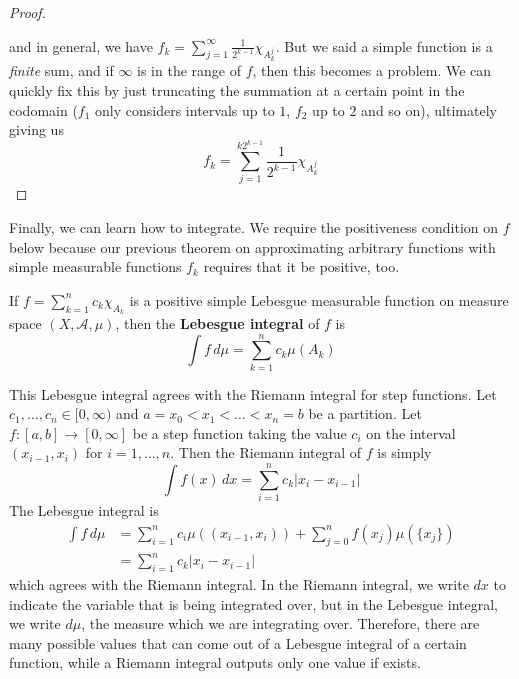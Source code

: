 \begin{proof}
\begin{center}
    \end{center}
    and in general, we have $f_k = \sum_{j=1}^\infty \frac{1}{2^{k-1}} \chi_{A^j_k}$. But we said a simple function is a \textit{finite} sum, and if $\infty$ is in the range of $f$, then this becomes a problem. We can quickly fix this by just truncating the summation at a certain point in the codomain ($f_1$ only considers intervals up to $1$, $f_2$ up to $2$ and so on), ultimately giving us 
    \begin{equation}
      f_k = \sum_{j=1}^{k 2^{k-1}} \frac{1}{2^{k-1}} \chi_{A^j_k} 
    \end{equation}
  \end{proof}

  Finally, we can learn how to integrate. We require the positiveness condition on $f$ below because our previous theorem on approximating arbitrary functions with simple measurable functions $f_k$ requires that it be positive, too. 

  \begin{definition}
    If $f = \sum_{k=1}^n c_k \chi_{A_k}$ is a positive simple Lebesgue measurable function on measure space $(X, \mathcal{A}, \mu)$, then the \textbf{Lebesgue integral} of $f$ is 
    \begin{equation}
      \int f \, d\mu = \sum_{k=1}^n c_k \mu(A_k)
    \end{equation}
  \end{definition}

  This Lebesgue integral agrees with the Riemann integral for step functions. Let $c_1, \ldots, c_n \in [0, \infty)$ and $a = x_0 < x_1 < \ldots < x_n = b$ be a partition. Let $f: [a, b] \longrightarrow [0, \infty]$ be a step function taking the value $c_i$ on the interval $(x_{i-1}, x_i)$ for $i = 1, \ldots, n$. Then the Riemann integral of $f$ is simply 
  \begin{equation}
    \int f(x) \,dx = \sum_{i=1}^n c_k |x_i - x_{i-1}|
  \end{equation}
  The Lebesgue integral is 
  \begin{align*}
    \int f \, d \mu & = \sum_{i=1}^n c_i \mu((x_{i-1}, x_i)) + \sum_{j=0}^n f(x_j) \mu(\{x_j\}) \\
    & = \sum_{i=1}^n c_k |x_i - x_{i-1}|
  \end{align*}
  which agrees with the Riemann integral. In the Riemann integral, we write $dx$ to indicate the variable that is being integrated over, but in the Lebesgue integral, we write $d \mu$, the measure which we are integrating over. Therefore, there are many possible values that can come out of a Lebesgue integral of a certain function, while a Riemann integral outputs only one value if exists. 

